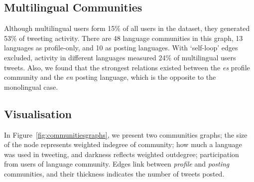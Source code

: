 \documentclass{llncs}
\begin{document}

\subsection{Multilingual Communities}

Although multilingual users form 15\% of all users in the dataset,
they generated 53\% of tweeting activity. There are 48 language
communities in this graph, 13 languages as profile-only, and 10 as
posting languages. With `self-loop' edges excluded, activity in
different languages measured 24\% of multilingual users tweets. Also,
we found that the strongest relations existed between the \emph{es}
profile community and the \emph{en} posting language, which is the
opposite to the monolingual case.


\subsection{Visualisation}

In Figure~\ref{fig:communitiesgraphs}, we present two communities
graphs; the size of the node represents weighted indegree of
community; how much a language was used in tweeting, and darkness
reflects weighted outdegree; participation from users of language
community. Edges link between \emph{profile} and \emph{posting}
communities, and their thickness indicates the number of tweets
posted.
\end{document}
